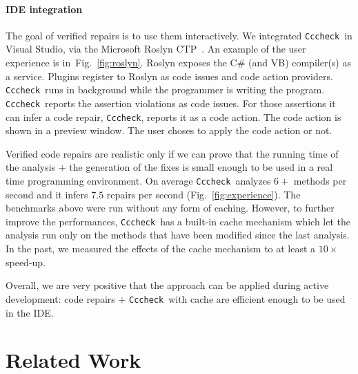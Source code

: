 \documentclass[10pt]{sigplanconf}
\newcommand{\refFig}[1]{Fig.~\ref{fig:#1}}
\newcommand{\code}[1]{\texttt{#1}}
\newcommand{\Clousot}{\code{Cccheck}}
\begin{document}
\paragraph{IDE integration}
The goal of verified repairs is to use them interactively.
We integrated \Clousot\ in Visual Studio, via  the Microsoft Roslyn CTP~\cite{roslyn}.
An example of the user experience is  in~\refFig{roslyn}.
Roslyn exposes the C\# (and VB) compiler(s) as a service.
Plugins  register to Roslyn as code issues and code action providers.
\Clousot\ runs in background while the programmer is writing the program.
\Clousot\ reports the assertion violations as code issues.
For those assertions it can infer a code repair, \Clousot, reports it as a code action.
The code action is shown in a preview window.
The user choses to apply the code action or not.

Verified code repairs are realistic only if we can prove that the running time of the analysis + the generation of the fixes is small enough to be used in a real time programming environment.
On average \Clousot\ analyzes $6+$ methods per second and it infers $7.5$ repairs per second (\refFig{experience}).
The benchmarks above were run without any form of caching.
However, to further improve the performances, \Clousot\ has a built-in cache mechanism which let the analysis run only on the methods that have been modified since the last analysis.
In the past, we measured  the effects of the cache mechanism to at least a $10\times$ speed-up.

Overall, we are very positive that the approach can be applied during active development: code repairs + \Clousot\ with cache are efficient enough to be used in the IDE.


\section{Related Work}
\label{sec:related}
\end{document}
